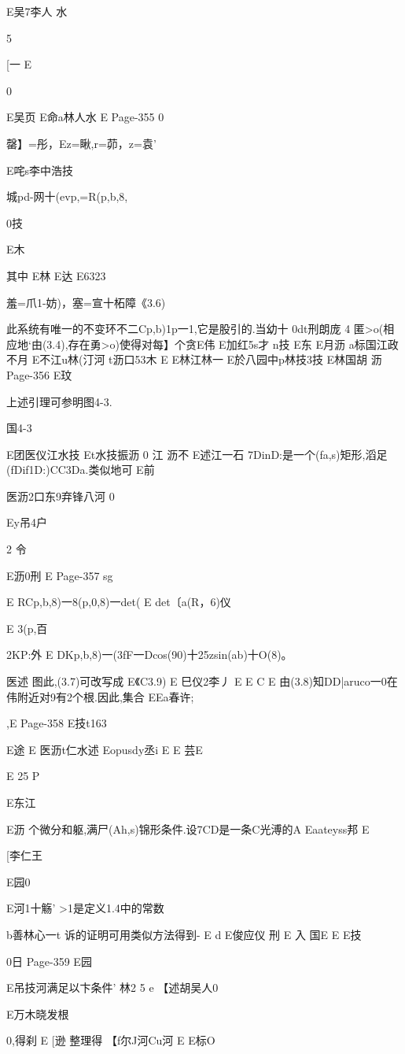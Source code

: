 {{{{{{{{{{{{{{{{{{{E吴7李人
水

5

[一
E

0

E吴页
E命a林人水
E
Page-355
0

罄】=彤，Ez=瞅,r=茆，z=袁'

E咤s李中浩技

城pd-网十(evp,=R(p,b,8,

0技

E木

其中
E林
E达
E6323

羞=爪1-妨)，塞=宣十柘障《3.6)

此系统有唯一的不变环不二{Cp,b)1p一1},它是股引的.当幼十
0dt刑朗庞
4
匿>o(相应地`由(3.4),存在勇>o)使得对每】个贪E伟
E加红5s才
n技
E东
E月沥
a标国江政不月
E不江u林(汀河
t沥口53木
E
E林江林一
E於八园中p林技3技
E林国胡
沥
Page-356
E玟

上述引理可参明图4-3.

国4-3

E团医仪江水技
Et水技振沥
0
江
沥不
E述江一石
7DinD:是一个(fa,s)矩形,滔足(fDif1D:)CC3Da.类似地可
E前

医沥2口东9弃锋八河
0

Ey吊4户

2
令

E沥0刑
E
Page-357
sg

E
RCp,b,8)一8(p,0,8)一det(
E
det〔a(R，6)仪

E
3(p,百

2KP:外
E
DKp,b,8)一(3fF一Dcos(90)十25zsin(ab)十O(8)。

医述
图此,(3.7)可改写成
E《C3.9)
E
巳仪2李丿
E
E
C
E
由(3.8)知DD|aruco一0在伟附近对9有2个根.因此,集合
EEa春许;

,E
Page-358
E技t163

E途
E
医沥t仁水述
Eopusdy丞i
E
E
芸E

E
25
P

E东江

E沥
个微分和躯,满尸(Ah,s)锦形条件.设7CD是一条C光溥的A
Eaateyss邦
E

[李仁王

E园0

E河1十觞'
>1是定义1.4中的常数

b善林心一t
诉的证明可用类似方法得到-
E
d
E俊应仪
刑
E
入
国E
E
E技

0日
Page-359
E园

E吊技河满足以卞条件'
林2
5
e
【述胡吴人0

E万木晓发根

0,得刹
E
[逊
整理得
【f尔J河Cu河
E
E标O

}}}}}}}}}}}}}}}}}}}
